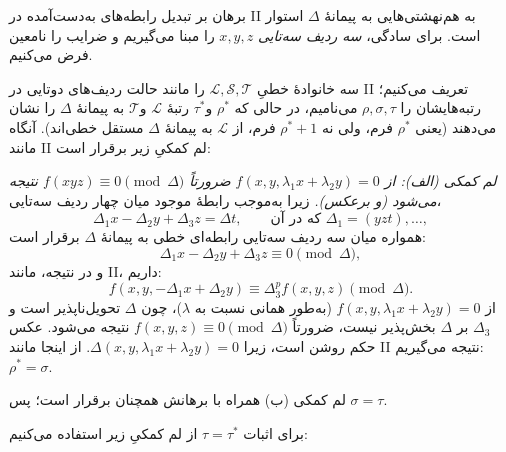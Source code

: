\documentclass[11pt]{article}
\begin{document}
برهان بر تبدیل رابطه‌های به‌دست‌آمده در II به هم‌نهشتی‌هایی به پیمانهٔ $\Delta$ استوار است. برای سادگی، \emph{سه ردیف سه‌تایی} $x,y,z$ را مبنا می‌گیریم و ضرایب را نامعین فرض می‌کنیم.

سه خانوادهٔ خطیِ $\mathcal L,\mathcal S,\mathcal T$ را مانند حالت ردیف‌های دوتایی در II تعریف می‌کنیم؛ رتبه‌هایشان را $\rho,\sigma,\tau$ می‌نامیم، در حالی که $\rho^*$ و$\tau^*$ رتبهٔ $\mathcal L$ و$\mathcal T$ به پیمانهٔ $\Delta$ را نشان می‌دهند (یعنی $\rho^*$ فرم، ولی نه $\rho^*+1$ فرم، از $\mathcal L$ به پیمانهٔ $\Delta$ مستقل خطی‌اند). آنگاه مانند II لم کمکیِ زیر برقرار است:

\emph{لم کمکی (الف): از $f(x,y,\lambda_1x+\lambda_2y)=0$ ضرورتاً $f(xyz)\equiv0\pmod{\Delta}$ نتیجه می‌شود (و برعکس).} زیرا به‌موجب رابطهٔ موجود میان چهار ردیف سه‌تایی،
\[
  \Delta_1x-\Delta_2y+\Delta_3z=\Delta t,
  \qquad \text{که در آن }\Delta_1=(yzt),\ldots,
\]
همواره میان سه ردیف سه‌تایی رابطه‌ای خطی به پیمانهٔ $\Delta$ برقرار است:
\[
  \Delta_1x-\Delta_2y+\Delta_3z\equiv0\pmod{\Delta},
\]
و در نتیجه، مانند II، داریم:
\[
  f(x,y,-\Delta_1x+\Delta_2y)\equiv\Delta_3^p f(x,y,z)\pmod{\Delta}.
\]
از $f(x,y,\lambda_1x+\lambda_2y)=0$ (به‌طور همانی نسبت به $\lambda$)، چون $\Delta$ تحویل‌ناپذیر است و $\Delta_3$ بر $\Delta$ بخش‌پذیر نیست، ضرورتاً $f(x,y,z)\equiv0\pmod{\Delta}$ نتیجه می‌شود. عکس حکم روشن است، زیرا $\Delta(x,y,\lambda_1x+\lambda_2y)=0$. از اینجا مانند II نتیجه می‌گیریم: $\rho^*=\sigma$.

لم کمکی (ب) همراه با برهانش همچنان برقرار است؛ پس $\sigma=\tau$.

برای اثبات $\tau=\tau^*$ از لم کمکیِ زیر استفاده می‌کنیم:
\end{document}
